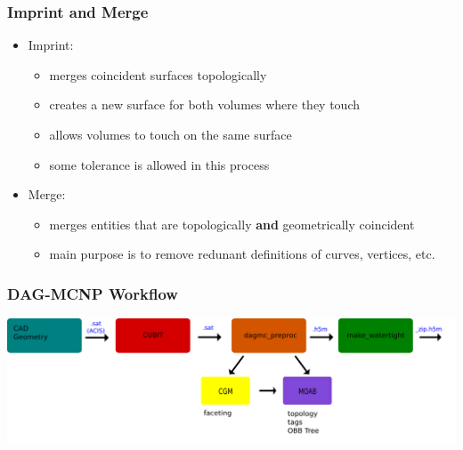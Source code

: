 \documentclass[14pt]{beamer}
\begin{document}
\begin{frame}
\frametitle{Imprint and Merge}
\begin{itemize}
\item Imprint:
	\begin{itemize}
	\item merges coincident surfaces topologically
    \item creates a new surface for both volumes where they touch
    \item allows volumes to touch on the same surface
    \item some tolerance is allowed in this process
	\end{itemize}
\item Merge:
	\begin{itemize}
	\item merges entities that are topologically
	\textbf{and} geometrically coincident
	\item main purpose is to remove redunant definitions of curves, vertices, etc.
	\end{itemize}
\end{itemize}

\end{frame}



\begin{frame}
\frametitle{DAG-MCNP Workflow}
\begin{center}
\includegraphics[scale=0.23, trim = 40 200 0 0 ]{DAGMC_Wrkflw3.png}
\end{center}
\end{frame}
\end{document}
